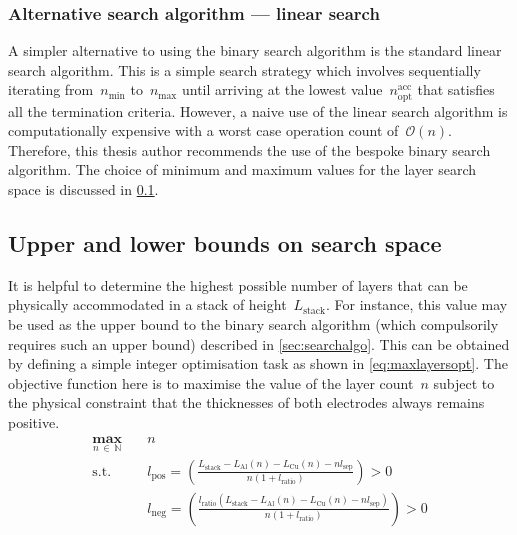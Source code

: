 \subsubsection*{Alternative search algorithm --- linear search}

A  simpler alternative  to using  the binary  search algorithm  is the  standard
linear  search  algorithm. This  is  a  simple  search strategy  which  involves
sequentially iterating  from~$n_\text{min}$ to~$n_\text{max}$  until arriving at
the lowest  value~$n_\text{opt}^\text{acc}$  that satisfies all  the termination
criteria. However, a naive use of the linear search algorithm is computationally
expensive with a worst case operation count of~$\mathcal{O}(n)$. Therefore, this
thesis author  recommends the use  of the  bespoke binary search  algorithm. The
choice of minimum and maximum values for  the layer search space is discussed in
\cref{sec:layersearchbounds}.

\subsection{Upper and lower bounds on search space}\label{sec:layersearchbounds}


It is  helpful to determine  the highest possible number  of layers that  can be
physically  accommodated in  a stack  of height~$L_\text{stack}$.  For instance,
this value may be used as the  upper bound to the binary search algorithm (which
compulsorily requires  such an upper bound)  described in \cref{sec:searchalgo}.
This can be obtained by defining a  simple integer optimisation task as shown in
\cref{eq:maxlayersopt}. The objective function here  is to maximise the value of
the layer count~$n$  subject to the physical constraint that  the thicknesses of
both electrodes always remains positive.
\begin{equation}\label{eq:maxlayersopt}
    \begin{aligned}
        \underset{n \, \in \, \mathbb{N}}{\mathbf{max}} \quad & n                                                                                                                                              \\
        \text{s.t.} \quad                                     & l_\text{pos} = \left(\frac{L_\text{stack} - L_\text{Al}(n) - L_\text{Cu}(n) - n l_\text{sep}}{n(1 + l_\text{ratio})}\right) > 0 \\
                                                              & l_\text{neg} = \left(\frac{l_\text{ratio}(L_\text{stack} - L_\text{Al}(n) - L_\text{Cu}(n) - n
l_\text{sep})}{n(1 + l_\text{ratio})}\right) > 0
\end{aligned}
\end{equation}


